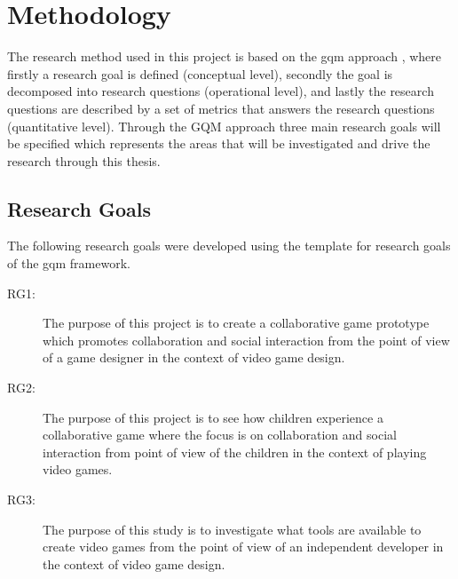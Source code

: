 \chapter{Methodology}
The research method used in this project is based on the \gls{gqm} approach \cite{1992basili}, where firstly a research goal is defined (conceptual level), secondly the goal is decomposed into research questions (operational level), and lastly the research questions are described by a set of metrics that answers the research questions (quantitative level). Through the GQM approach three main research goals will be specified which represents the areas that will be investigated and drive the research through this thesis.



\section{Research Goals}
The following research goals were developed using the template for research goals of the \gls{gqm} framework.

\begin{description}
	\item[RG1:] The purpose of this project is to create a collaborative game prototype which promotes collaboration and social interaction from the point of view of a game designer in the context of video game design.
	
	\item[RG2:] The purpose of this project is to see how children experience a collaborative game where the focus is on collaboration and social interaction from point of view of the children in the context of playing video games.
	
	\item[RG3:] The purpose of this study is to investigate what tools are available to create video games from the point of view of an independent developer in the context of video game design. 
\end{description}



